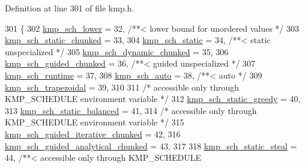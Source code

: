Definition at line 301 of file kmp.\-h.


\begin{DoxyCode}
301                 \{
302     \hyperlink{group__WORK__SHARING_ggadcaf200537aaa0218a60c398438f81bea7ed3535e3c97c9c2ce299addd74b4a01}{kmp\_sch\_lower}                     = 32,   \textcolor{comment}{/**< lower bound for unordered values */}
303     \hyperlink{group__WORK__SHARING_ggadcaf200537aaa0218a60c398438f81bea8521b598e4c2014936813c104adfab4b}{kmp\_sch\_static\_chunked}            = 33,
304     \hyperlink{group__WORK__SHARING_ggadcaf200537aaa0218a60c398438f81bea2a987351b9605b918693a17d4dd90772}{kmp\_sch\_static}                    = 34,   \textcolor{comment}{/**< static unspecialized */}
305     \hyperlink{group__WORK__SHARING_ggadcaf200537aaa0218a60c398438f81bea55ec779ed16f7959a24e65feadcbdbeb}{kmp\_sch\_dynamic\_chunked}           = 35,
306     \hyperlink{group__WORK__SHARING_ggadcaf200537aaa0218a60c398438f81bea52b66fc7ba82beb3d6fbdb82a6ef045d}{kmp\_sch\_guided\_chunked}            = 36,   \textcolor{comment}{/**< guided unspecialized */}
307     \hyperlink{group__WORK__SHARING_ggadcaf200537aaa0218a60c398438f81bea2cae9ebb984349b75fe470cc6aa4cd19}{kmp\_sch\_runtime}                   = 37,
308     \hyperlink{group__WORK__SHARING_ggadcaf200537aaa0218a60c398438f81bea270b6b98ec2f9ec4832f7a59b0a0d532}{kmp\_sch\_auto}                      = 38,   \textcolor{comment}{/**< auto */}
309     \hyperlink{group__WORK__SHARING_ggadcaf200537aaa0218a60c398438f81bea904631666318a8490fc48df394616dbd}{kmp\_sch\_trapezoidal}               = 39,
310 
311     \textcolor{comment}{/* accessible only through KMP\_SCHEDULE environment variable */}
312     \hyperlink{group__WORK__SHARING_ggadcaf200537aaa0218a60c398438f81bea67c1b7c70c012361c0218269ac063606}{kmp\_sch\_static\_greedy}             = 40,
313     \hyperlink{group__WORK__SHARING_ggadcaf200537aaa0218a60c398438f81bea5869a7f3c202fef826c9368fa155dcdb}{kmp\_sch\_static\_balanced}           = 41,
314     \textcolor{comment}{/* accessible only through KMP\_SCHEDULE environment variable */}
315     \hyperlink{group__WORK__SHARING_ggadcaf200537aaa0218a60c398438f81beaa6177807dac327b1240c43ab9f2d1f12}{kmp\_sch\_guided\_iterative\_chunked}  = 42,
316     \hyperlink{group__WORK__SHARING_ggadcaf200537aaa0218a60c398438f81bea569ad1692047e89645f19bca3f2c26af}{kmp\_sch\_guided\_analytical\_chunked} = 43,
317 
318     \hyperlink{group__WORK__SHARING_ggadcaf200537aaa0218a60c398438f81beae4b8e84801f56fdb39472c45762bd051}{kmp\_sch\_static\_steal}              = 44,   \textcolor{comment}{/**< accessible only through KMP\_SCHEDULE
}
\end{DoxyCode}
